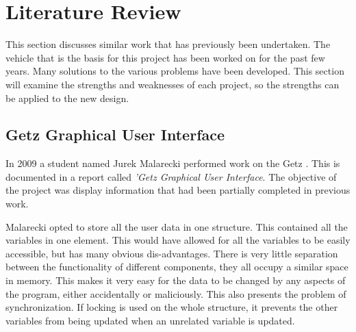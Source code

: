 
\chapter{Literature Review} %



\ifpdf
    \graphicspath{{X/figures/PNG/}{X/figures/PDF/}{X/figures/}}
\else
    \graphicspath{{X/figures/EPS/}{X/figures/}}
\fi


This section discusses similar work that has previously been undertaken. The vehicle that is the basis for this project has been worked on for the past few years. Many solutions to the various problems have been developed. This section will examine the strengths and weaknesses of each project, so the strengths can be applied to the new design.


\section{Getz Graphical User Interface}

In 2009 a student named Jurek Malarecki performed work on the Getz \cite{thesis_malarecki}. This is documented in a report called \emph{'Getz Graphical User Interface}. The objective of the project was display information that had been partially completed in previous work.

Malarecki opted to store all the user data in one structure. This contained all the variables in one element.  This would have allowed for all the variables to be easily accessible, but has many obvious dis-advantages. There is very little separation between the functionality of different components, they all occupy a similar space in memory. This makes it very easy for the data to be changed by any aspects of the program, either accidentally or maliciously. This also presents the problem of synchronization. If locking is used on the whole structure, it prevents the other variables from being updated when an unrelated variable is updated.

